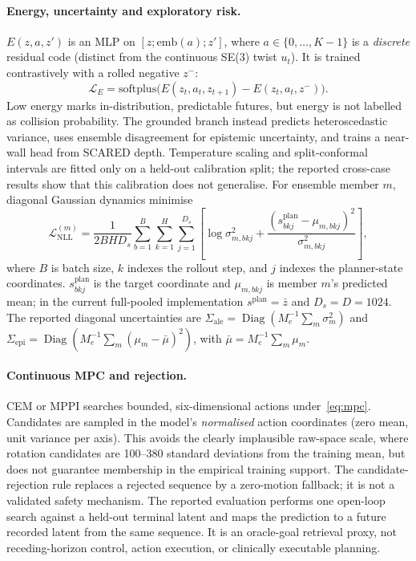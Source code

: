 \documentclass[preprint,12pt]{elsarticle}
\begin{document}
\paragraph{Energy, uncertainty and exploratory risk.}
$E(z,a,z')$ is an MLP on $[z;\mathrm{emb}(a);z']$, where
$a\in\{0,\ldots,K-1\}$ is a \emph{discrete} residual code (distinct from the
continuous SE(3) twist $u_t$). It is trained contrastively with a rolled
negative $z^{-}$:
\begin{equation}
\mathcal{L}_E
=
\mathrm{softplus}\bigl(
E(z_t,a_t,z_{t+1})-E(z_t,a_t,z^{-})
\bigr).
\label{eq:energy}
\end{equation}
Low energy marks in-distribution, predictable futures, but energy is not
labelled as collision probability. The grounded branch instead predicts
heteroscedastic variance, uses ensemble disagreement for epistemic uncertainty,
and trains a near-wall head from SCARED depth. Temperature scaling and
split-conformal intervals are fitted only on a held-out calibration split;
the reported cross-case results show that this calibration does not
generalise.
For ensemble member $m$, diagonal Gaussian dynamics minimise
\begin{equation}
\mathcal{L}_{\mathrm{NLL}}^{(m)}
=
\frac{1}{2BHD_s}
\sum_{b=1}^{B}\sum_{k=1}^{H}\sum_{j=1}^{D_s}
\left[
\log \sigma_{m,bkj}^{2}
+
\frac{(s_{bkj}^{\mathrm{plan}}-\mu_{m,bkj})^2}
{\sigma_{m,bkj}^{2}}
\right],
\label{eq:nll}
\end{equation}
where $B$ is batch size, $k$ indexes the rollout step, and $j$ indexes the
planner-state coordinates. $s^{\mathrm{plan}}_{bkj}$ is the target coordinate
and $\mu_{m,bkj}$ is member $m$'s predicted mean; in the current full-pooled
implementation $s^{\mathrm{plan}}=\bar z$ and $D_s=D=1024$. The reported
diagonal uncertainties are
$\Sigma_{\mathrm{ale}}=\operatorname{Diag}
(M_e^{-1}\sum_m\sigma_m^2)$ and
$\Sigma_{\mathrm{epi}}=\operatorname{Diag}
(M_e^{-1}\sum_m(\mu_m-\bar\mu)^2)$, with
$\bar\mu=M_e^{-1}\sum_m\mu_m$.

\paragraph{Continuous MPC and rejection.}
CEM or MPPI searches bounded, six-dimensional actions under~\eqref{eq:mpc}.
Candidates are sampled in the model's \emph{normalised} action coordinates
(zero mean, unit variance per axis). This avoids the clearly implausible
raw-space scale, where rotation candidates are 100--380 standard deviations
from the training mean, but does not guarantee membership in the empirical
training support. The candidate-rejection rule replaces a rejected sequence by
a zero-motion fallback; it is not a validated safety mechanism.
The reported evaluation performs one open-loop search against a held-out
terminal latent and maps the prediction to a future recorded latent from the
same sequence. It is an oracle-goal retrieval proxy, not receding-horizon
control, action execution, or clinically executable planning.
\end{document}
